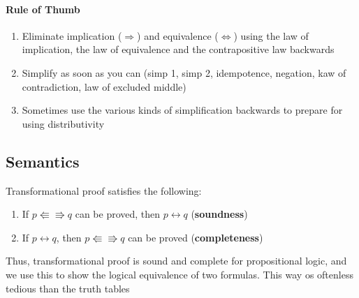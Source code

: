 \documentclass[12pt]{report}
\begin{document}
      \paragraph{Rule of Thumb}
      \begin{enumerate}
        \item Eliminate implication ($\Rightarrow$) and
          equivalence ($\Leftrightarrow$) using the law of implication, the law
          of equivalence and the contrapositive law backwards
        \item Simplify as soon as you can (simp 1, simp 2, idempotence,
          negation, kaw of contradiction, law of excluded middle)
        \item Sometimes use the various kinds of simplification backwards to
          prepare for using distributivity
      \end{enumerate}

    \subsection{Semantics}
      Transformational proof satisfies the following:
      \begin{enumerate}
        \item If $p\Lleftarrow\Rrightarrow q$ can be proved, then $p
          \leftrightarrow q$ (\textbf{soundness})
        \item If $p \leftrightarrow q$, then $p\Lleftarrow\Rrightarrow q$ can
          be proved (\textbf{completeness})
      \end{enumerate}
      Thus, transformational proof is sound and complete for propositional
      logic, and we use this to show the logical equivalence of two formulas.
      This way os oftenless tedious than the truth tables
\end{document}
